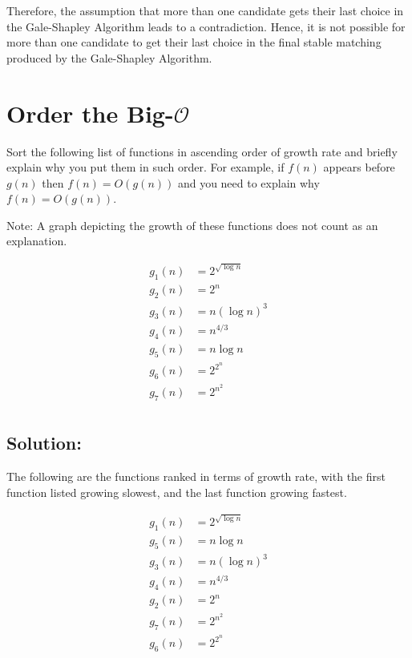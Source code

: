 \documentclass[11pt]{article}
\begin{document}
Therefore, the assumption that more than one candidate gets their last choice in the Gale-Shapley Algorithm leads to a contradiction. Hence, it is not possible for more than one candidate to get their last choice in the final stable matching produced by the Gale-Shapley Algorithm.



\section{Order the Big-\texorpdfstring{$\mathcal{O}$} }


Sort the following list of functions in ascending order of growth rate and briefly explain why you put them in such order. For example, if $f(n)$ appears before $g(n)$ then $f(n) = O(g(n))$ and you need to explain why $f(n) = O(g(n))$.

Note: A graph depicting the growth of these functions does not count as an explanation.

    \begin{align*}
        g_1(n) &= 2^{\sqrt{\log n}} \\
        g_2(n) &= 2^n \\
        g_3(n) &= n {(\log n)}^3 \\
        g_4(n) &= n^{4/3} \\
        g_5(n) &= n \log n \\
        g_6(n) &= 2^{2^n} \\
        g_7(n) &= 2^{n^2} \\
    \end{align*}

\subsection{Solution: }

The following are the functions ranked in terms of growth rate, with the first function listed growing slowest, and the last function growing fastest.

    \begin{align*}
        g_1(n) &= 2^{\sqrt{\log n}} \\
        g_5(n) &= n \log n \\
        g_3(n) &= n {(\log n)}^3 \\
        g_4(n) &= n^{4/3} \\
        g_2(n) &= 2^n \\ 
        g_7(n) &= 2^{n^2} \\      
        g_6(n) &= 2^{2^n} \\
    \end{align*}
\end{document}
